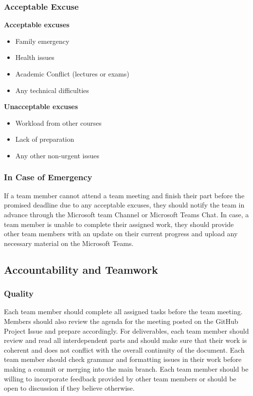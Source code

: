\documentclass{article}
\begin{document}
\subsubsection*{Acceptable Excuse}
\textbf{Acceptable excuses}
\begin{itemize} 
\item Family emergency 
\item Health issues 
\item Academic Conflict (lectures or exams) 
\item Any technical difficulties
\end {itemize}

\textbf{Unacceptable excuses}
\begin{itemize}
\item Workload from other courses 
\item Lack of preparation 
\item Any other non-urgent issues 
\end {itemize}

\subsubsection*{In Case of Emergency}
If a team member cannot attend a team meeting and finish their part before the promised deadline due to any acceptable excuses, they should notify the team in advance through the Microsoft team Channel or Microsoft Teams Chat. In case, a team member is unable to complete their assigned work, they should provide other team members with an update on their current progress and upload any necessary material on the Microsoft Teams.

\subsection*{Accountability and Teamwork}

\subsubsection*{Quality} 
Each team member should complete all assigned tasks before the team meeting. Members should also review the agenda for the meeting posted on the GitHub Project Issue and prepare accordingly. For deliverables, each team member should review and read all interdependent parts and should make sure that their work is coherent and does not conflict with the overall continuity of the document. Each team member should check grammar and formatting issues in their work before making a commit or merging into the main branch. Each team member should be willing to incorporate feedback provided by other team members or should be open to discussion if they believe otherwise.
\end{document}
